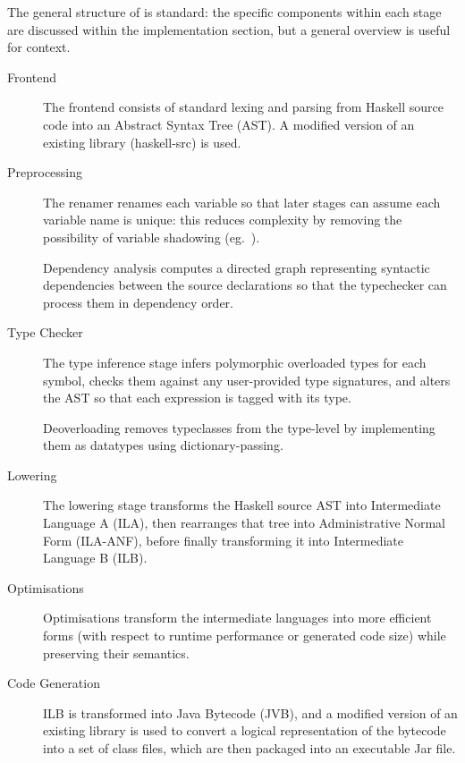 \documentclass[dissertation.tex]{subfiles}
\begin{document}
{
    The general structure of \compilername is standard: the specific components within each stage are discussed within the implementation section, but a general overview is useful for context.

    \begin{description}
    \item[Frontend]
    {
        \hfill

        The frontend consists of standard lexing and parsing from Haskell source code into an Abstract Syntax Tree (AST). A modified version of an existing library (haskell-src\cite{hs-java-forked}) is used.

    }
    \item[Preprocessing]
    {
        \hfill

        The renamer renames each variable so that later stages can assume each variable name is unique: this reduces complexity by removing the possibility of variable shadowing (eg.\ ). 

        Dependency analysis computes a directed graph representing syntactic dependencies between the source declarations so that the typechecker can process them in dependency order.
    }
    \item[Type Checker]
    {
        \hfill

        The type inference stage infers polymorphic overloaded types for each symbol, checks them against any user-provided type signatures, and alters the AST so that each expression is tagged with its type.

        Deoverloading removes typeclasses from the type-level by implementing them as datatypes using dictionary-passing.
    }
    \item[Lowering]
    {
        \hfill

        The lowering stage transforms the Haskell source AST into Intermediate Language A (ILA), then rearranges that tree into Administrative Normal Form (ILA-ANF), before finally transforming it into Intermediate Language B (ILB).
    }
    \item[Optimisations]
    {
        \hfill

        Optimisations transform the intermediate languages into more efficient forms (with respect to runtime performance or generated code size) while preserving their semantics.
    }
    \item[Code Generation]
    {
        \hfill

        ILB is transformed into Java Bytecode (JVB), and a modified version of an existing library\cite{hs-java-forked} is used to convert a logical representation of the bytecode into a set of class files, which are then packaged into an executable Jar file.
    }
    \end{description}
}
\end{document}
